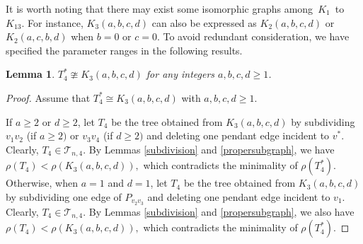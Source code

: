 \documentclass[12pt]{amsart}
\newtheorem{lem}{Lemma}[section]
\begin{document}
It is worth noting that there may exist some isomorphic graphs among \(K_1\) to \(K_{13}\).  For instance, $K_3(a,b,c,d)$ can also be expressed as $K_2(a,b,c,d)$ or $K_2(a,c,b,d)$ when $b=0$ or $c=0$. To avoid redundant consideration, we have specified the parameter ranges in the following results.

\begin{lem}\label{lem-3.10}
	\(T_4^*\ncong K_3(a,b,c,d)\) for any integers \(a, b, c, d \geq 1\).
\end{lem}

\begin{proof}
	Assume that \(T_4^* \cong K_3(a,b,c,d)\) with \(a, b, c, d \geq 1\). 
	
	If $a \geq 2$ or $d\geq 2$, let \(T_4\) be the tree obtained from \(K_3(a,b,c,d)\) by subdividing $v_1v_2$ (if $a \geq 2)$ or $v_3v_4$ (if $d \geq 2)$ and deleting one pendant edge incident to \(v^*\). 
	Clearly, \(T_4 \in \mathcal{T}_{n,4}\). 
	By Lemmas  \ref{subdivision} and \ref{propersubgraph}, we have
	\(
	\rho(T_4) < \rho(K_3(a,b,c,d)),
	\)
	which contradicts the minimality of \(\rho(T_4^*)\). Otherwise, when $a=1$ and $d=1$, let \(T_4\) be the tree obtained from \(K_3(a,b,c,d)\) by subdividing one edge of $P_{v_2v_3}$ and deleting one pendant edge incident to \(v_1\). 
	Clearly, \(T_4 \in \mathcal{T}_{n,4}\). 
	By Lemmas  \ref{subdivision} and \ref{propersubgraph}, we also have
	\(
	\rho(T_4) < \rho(K_3(a,b,c,d)),
	\)
	which contradicts the minimality of \(\rho(T_4^*)\).
\end{proof}
\end{document}
